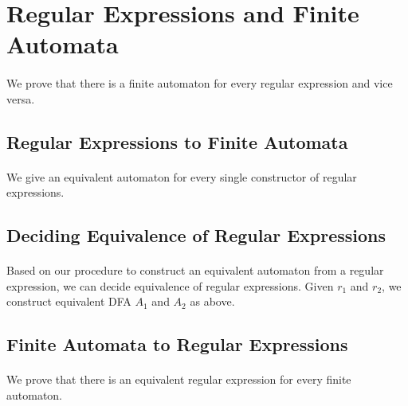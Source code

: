 \documentclass[11pt,a4paper,oneside]{book}
\begin{document}
            
        \section{Regular Expressions and Finite Automata}

            \paragraph{} 
                We prove that there is a finite automaton for every regular expression and vice versa. 

            \subsection{Regular Expressions to Finite Automata}

                \paragraph{} 
                    We give an equivalent automaton for every single constructor of regular expressions.


            \subsection{Deciding Equivalence of Regular Expressions}

                \paragraph{} 
                    Based on our procedure to construct an equivalent automaton from a regular expression, we can decide equivalence of regular expressions. Given $r_1$ and $r_2$, we construct equivalent DFA $A_1$ and $A_2$ as above.
                    

            \subsection{Finite Automata to Regular Expressions}
                \paragraph{}
                    We prove that there is an equivalent regular expression for every finite automaton.
\end{document}
